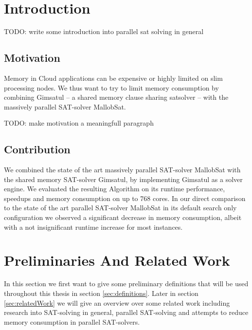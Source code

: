 \documentclass[12pt,a4paper,twoside]{scrartcl}
\numberwithin{equation}{section}
\begin{document}
\tableofcontents

\clearpage


\listoffigures
\listoftables

\clearpage


\section{Introduction}

TODO: write some introduction into parallel sat solving in general

\subsection{Motivation}

Memory in Cloud applications can be expensive or highly limited on slim processing nodes. We thus want to try to limit memory consumption by combining Gimsatul -- a shared memory clause sharing satsolver -- with the massively parallel SAT-solver MallobSat.


TODO: make motivation a meaningfull paragraph

\subsection{Contribution}

We combined the state of the art massively parallel SAT-solver MallobSat with the shared memory SAT-solver Gimsatul, by implementing Gimsatul as a solver engine. We evaluated the resulting Algorithm on its runtime performance, speedups and memory consumption on up to 768 cores. In our direct comparison to the state of the art parallel SAT-solver MallobSat in its default search only configuration we observed a significant decrease in memory consumption, albeit with a not insignificant runtime increase for most instances.


\section{Preliminaries And Related Work}

In this section we first want to give some preliminary definitions that will be used throughout this thesis in section \ref{sec:definitions}. Later in section \ref{sec:relatedWork} we will give an overview over some related work including research into SAT-solving in general, parallel SAT-solving and attempts to reduce memory consumption in parallel SAT-solvers.
\end{document}
